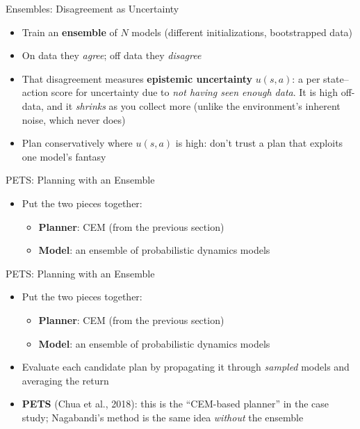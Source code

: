 \begin{frame}{Ensembles: Disagreement as Uncertainty}
\begin{itemize}
    \item Train an \textbf{ensemble} of $N$ models (different initializations,
          bootstrapped data)
    \item On data they \emph{agree}; off data they \emph{disagree}
    \item That disagreement measures \textbf{epistemic uncertainty} $u(s,a)$: a
          per state--action score for uncertainty due to \emph{not having seen
          enough data}. It is high off-data, and it \emph{shrinks} as you collect
          more (unlike the environment's inherent noise, which never does)
    \item Plan conservatively where $u(s,a)$ is high: don't trust a plan that
          exploits one model's fantasy
\end{itemize}
\end{frame}

\begin{frame}{PETS: Planning with an Ensemble}
\begin{itemize}
    \item Put the two pieces together:
    \begin{itemize}
        \item \textbf{Planner}: CEM (from the previous section)
        \item \textbf{Model}: an ensemble of probabilistic dynamics models
    \end{itemize}
\end{itemize}
\end{frame}

\begin{frame}{PETS: Planning with an Ensemble}
\begin{itemize}
    \item Put the two pieces together:
    \begin{itemize}
        \item \textbf{Planner}: CEM (from the previous section)
        \item \textbf{Model}: an ensemble of probabilistic dynamics models
    \end{itemize}
    \item Evaluate each candidate plan by propagating it through \emph{sampled}
          models and averaging the return
    \item \textbf{PETS} (Chua et al., 2018): this is the ``CEM-based planner''
          in the case study; Nagabandi's method is the same idea \emph{without}
          the ensemble
\end{itemize}
\end{frame}
